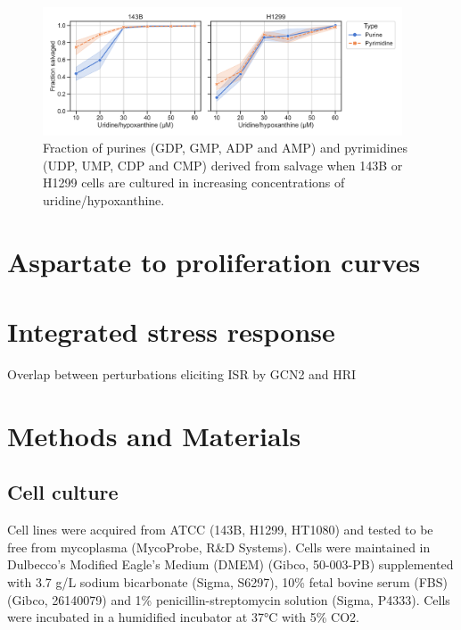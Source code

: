 \begin{figure}
    \centering
    \includegraphics[width=0.95\textwidth]{figures/chap2/sal_frac_conc.pdf}
    \caption[Salvage as a function of Urd/Hpx concentration]{
    Fraction of purines (GDP, GMP, ADP and AMP) and pyrimidines (UDP, UMP, CDP and CMP) derived from salvage when 143B or H1299 cells are cultured in increasing concentrations of uridine/hypoxanthine.
    }
    \label{fig:ch2:sal_frac_conc}
\end{figure}







\section{Aspartate to proliferation curves}






\section{Integrated stress response}

Overlap between perturbations eliciting ISR by GCN2 and HRI \cite{Taniuchi2016-nc}









\section{Methods and Materials}

\subsection{Cell culture}
Cell lines were acquired from ATCC (143B, H1299, HT1080) and tested to be free from mycoplasma (MycoProbe, R\&D Systems).
Cells were maintained in Dulbecco’s Modified Eagle’s Medium (DMEM) (Gibco, 50-003-PB) supplemented with 3.7 g/L sodium bicarbonate (Sigma, S6297), 10\% fetal bovine serum (FBS) (Gibco, 26140079) and 1\% penicillin-streptomycin solution (Sigma, P4333).
Cells were incubated in a humidified incubator at 37°C with 5\% CO2.


